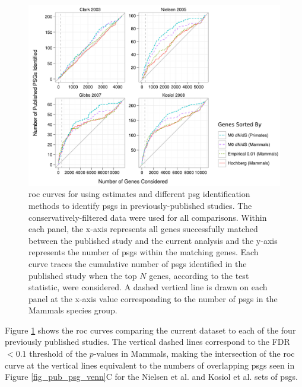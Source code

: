 \begin{figure}
\centering
\includegraphics[scale=0.78]{Figs/psg_rocs.pdf}
\caption{\ac{roc} curves for using \dnds estimates and different
  \ac{psg} identification methods to identify \acp{psg} in
  previously-published studies. The conservatively-filtered \sw data
  were used for all comparisons. Within each panel, the x-axis
  represents all genes successfully matched between the published
  study and the current analysis and the y-axis represents the number
  of \acp{psg} within the matching genes. Each curve traces the
  cumulative number of \acp{psg} identified in the published study
  when the top $N$ genes, according to the test statistic, were
  considered. A dashed vertical line is drawn on each panel at the
  x-axis value corresponding to the number of \psgeone \acp{psg} in
  the Mammals species group.}
\label{fig_psg_rocs}
\end{figure}

Figure \ref{fig_psg_rocs} shows the \ac{roc} curves comparing the
current dataset to each of the four previously published studies. The
vertical dashed lines correspond to the FDR$<0.1$ threshold of the
\psgeone $p$-values in Mammals, making the intersection of the
\psgeone \ac{roc} curve at the vertical lines equivalent to the
numbers of overlapping \acp{psg} seen in Figure
\ref{fig_pub_psg_venn}C for the Nielsen et
al. \citeyearpar{Nielsen2005} and Kosiol et
al. \citeyearpar{Kosiol2008} sets of \acp{psg}.

